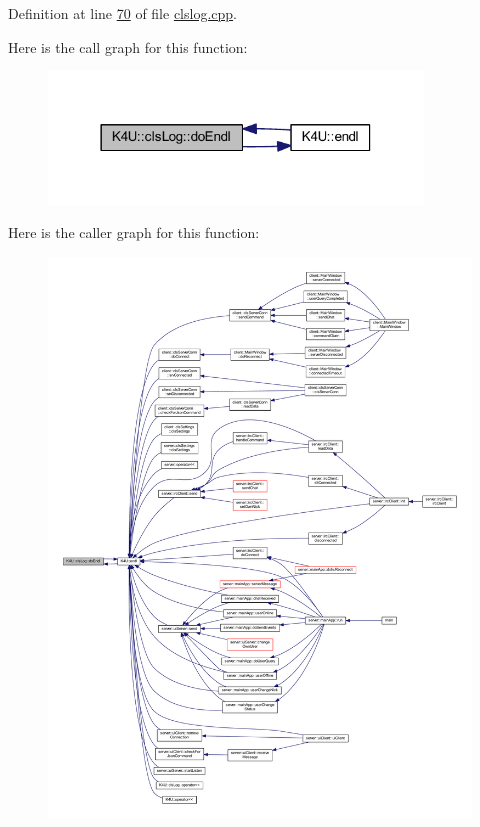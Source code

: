 Definition at line \hyperlink{clslog_8cpp_source_l00070}{70} of file \hyperlink{clslog_8cpp_source}{clslog.\-cpp}.



Here is the call graph for this function\-:\nopagebreak
\begin{figure}[H]
\begin{center}
\leavevmode
\includegraphics[width=282pt]{da/d64/class_k4_u_1_1cls_log_a81f179b2ccb3e2abeb9b47f5b83de935_cgraph}
\end{center}
\end{figure}




Here is the caller graph for this function\-:
\nopagebreak
\begin{figure}[H]
\begin{center}
\leavevmode
\includegraphics[width=350pt]{da/d64/class_k4_u_1_1cls_log_a81f179b2ccb3e2abeb9b47f5b83de935_icgraph}
\end{center}
\end{figure}


